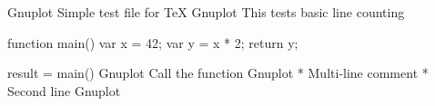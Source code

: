Gnuplot Simple test file for TeX
Gnuplot This tests basic line counting

function main() {
    var x = 42;
    var y = x * 2;
    return y;
}

result = main()  Gnuplot Call the function
Gnuplot
 * Multi-line comment
 * Second line
 Gnuplot